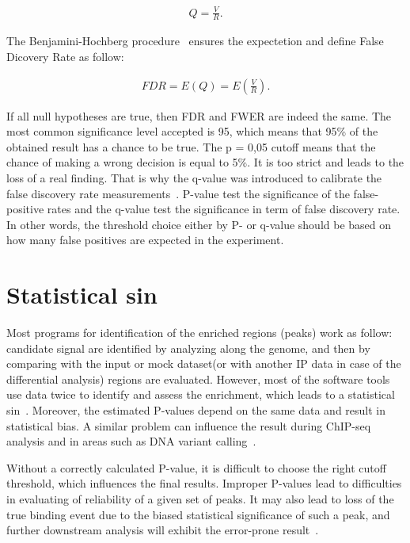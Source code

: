 \begin{align*}
    Q = \frac{V}{R} .
\end{align*}

The Benjamini-Hochberg procedure~\cite{benjamini2000adaptive} ensures the expectetion and define False Dicovery Rate as follow: 

\begin{align*}
    FDR = E(Q) = E \left(\frac{V}{R}\right) .
\end{align*}

If all null hypotheses are true, then FDR and FWER are indeed the same.
The most common significance level accepted is 95, which means that 95\% of the obtained result has a chance to be true. 
The p = 0,05 cutoff means that the chance of making a wrong decision is equal to 5\%. 
It is too strict and leads to the loss of a real finding. 
That is why the q-value was introduced to calibrate the false discovery rate measurements~\cite{storey2003statistical}. 
P-value test the significance of the false-positive rates and the q-value test the significance in term of false discovery rate. 
In other words, the threshold choice either by P- or q-value should be based on how many false positives are expected in the experiment.



\section{Statistical sin}

Most programs for identification of the enriched regions (peaks) work as follow: candidate signal are identified by analyzing along the genome, and then by comparing with the input or mock dataset(or with another IP data in case of the differential analysis) regions are evaluated. 
However, most of the software tools use data twice to identify and assess the enrichment, which leads to a statistical sin~\cite{lun2014novo}. 
Moreover, the estimated P-values depend on the same data and result in statistical bias.
A similar problem can influence the result during ChIP-seq analysis and in areas such as DNA variant calling~\cite{chitpin2019recap}.

Without a correctly calculated P-value, it is difficult to choose the right cutoff threshold, which influences the final results. 
Improper P-values lead to difficulties in evaluating of reliability of a given set of peaks.
It may also lead to loss of the true binding event due to the biased statistical significance of such a peak, and further downstream analysis will exhibit the error-prone result~\cite{chitpin2019recap}. 

